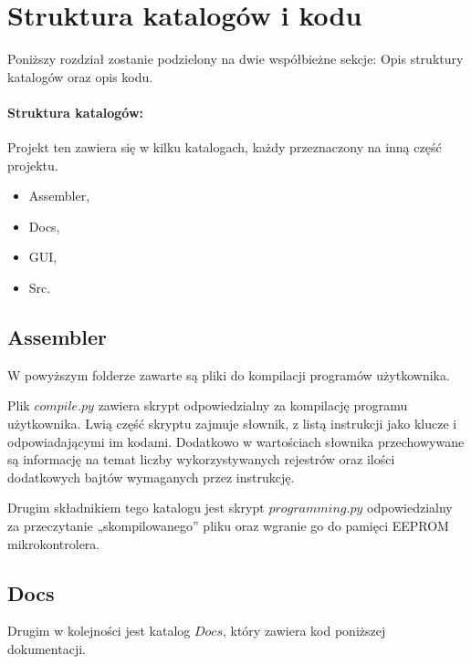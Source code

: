 \section{Struktura katalogów i kodu}
    \tab Poniższy rozdział zostanie podzielony na dwie współbieżne sekcje:
    Opis struktury katalogów oraz opis kodu.

    \paragraph{Struktura katalogów:\\}
        Projekt ten zawiera się w kilku katalogach, każdy przeznaczony na inną część projektu.
        \begin{itemize}
            \item Assembler,
            \item Docs,
            \item GUI,
            \item Src.
        \end{itemize}

    \subsection{Assembler}
        \tab W powyższym folderze zawarte są pliki do kompilacji programów użytkownika.

        Plik $compile.py$ zawiera skrypt odpowiedzialny za kompilację programu użytkownika.
        Lwią część skryptu zajmuje słownik, z listą instrukcji jako klucze i odpowiadającymi im kodami. 
        Dodatkowo w wartościach słownika przechowywane są informację na temat liczby wykorzystywanych rejestrów oraz ilości dodatkowych bajtów wymaganych przez instrukcję.

        Drugim składnikiem tego katalogu jest skrypt $programming.py$ odpowiedzialny za przeczytanie „skompilowanego” pliku oraz wgranie go do pamięci EEPROM mikrokontrolera.

    \subsection{Docs}
        \tab Drugim w kolejności jest katalog $Docs$, który zawiera kod poniższej dokumentacji.
    

